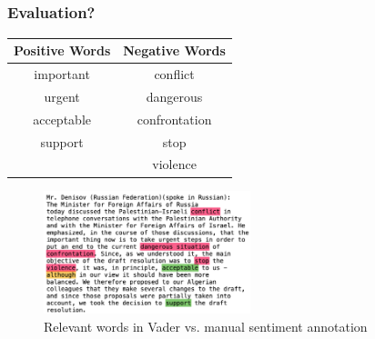\documentclass{beamer}
\begin{document}
\subsection{}
\begin{framefont}{\footnotesize}
	\begin{frame}
		\frametitle{Evaluation?}
	\begin{table}[]
\begin{tabular}{c|c|}
\hline
\multicolumn{1}{|c|}{\textbf{Positive Words}} & \textbf{Negative Words} \\ \hline
\multicolumn{1}{|c|}{important}               & conflict                \\ \hline
\multicolumn{1}{|c|}{urgent}                  & dangerous               \\ \hline
\multicolumn{1}{|c|}{acceptable}              & confrontation           \\ \hline
\multicolumn{1}{|c|}{support}                 & stop                    \\ \hline
                                              & violence                \\ \cline{2-2} 
\end{tabular}
\end{table}

		\begin{figure}
					\includegraphics[trim={0cm 0cm 0cm 0cm},clip,width=6cm]{russia_manual.png}
					\caption{Relevant words in Vader vs. manual sentiment annotation}
			\end{figure}
			
	
	\end{frame}
\end{framefont}
\end{document}
